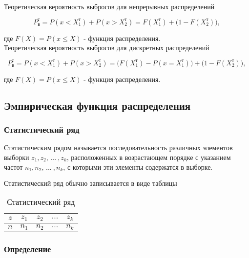 Теоретическая вероятность выбросов для непрерывных распределений

\begin{equation} \label{eq:probTheorCont}
	P_\text{в}^\text{т} = P(x < X_1^\text{т}) + P(x > X_2^\text{т}) = F(X_1^\text{т}) + \Big(1 - F(X_2^\text{т})\Big),
\end{equation}

где $F(X) = P(x \le X)$ - функция распределения.\\

Теоретическая вероятность выбросов для дискретных распределений

\begin{equation} \label{eq:probTheorDisc}
	P_\text{в}^\text{т} = P(x < X_1^\text{т}) + P(x > X_2^\text{т}) = \Big(F(X_1^\text{т}) - P(x = X_1^\text{т})\Big) + \Big(1 - F(X_2^\text{т})\Big),
\end{equation}

где $F(X) = P(x \le X)$ - функция распределения.

\subsection{Эмпирическая функция распределения}

\subsubsection{Статистический ряд}

Статистическим рядом называется последовательность различных элементов выборки $z_1, z_2, \, ... \: , z_k$, расположенных в возрастающем порядке с указанием частот $n_1, n_2, \, ... \: , n_k$, с которыми эти элементы содержатся в выборке.

Статистический ряд обычно записывается в виде таблицы

\begin{table}[h!]
	\begin{center}
		\begin{tabular}{|c|c|c|c|c|}
			\hline
			$z$ & $z_1$ & $z_2$ & $...$ & $z_k$ \\
			\hline
			$n$ & $n_1$ & $n_2$ & $...$ & $n_k$ \\
			\hline
		\end{tabular}
	\end{center}
	\caption{Статистический ряд}
\end{table} 

\subsubsection{Определение}

